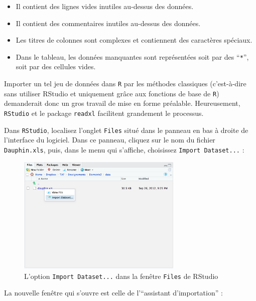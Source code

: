 \documentclass[
  a4paper,
  DIV=11,
  numbers=noendperiod,
  oneside]{scrreprt}
\providecommand{\tightlist}{%
  \setlength{\itemsep}{0pt}\setlength{\parskip}{0pt}}\usepackage{longtable,booktabs,array}
\begin{document}
\begin{itemize}
\tightlist
\item
  Il contient des lignes vides inutiles au-dessus des données.
\item
  Il contient des commentaires inutiles au-dessus des données.
\item
  Les titres de colonnes sont complexes et contiennent des caractères
  spéciaux.
\item
  Dans le tableau, les données manquantes sont représentées soit par des
  ``\texttt{*}'', soit par des cellules vides.
\end{itemize}

Importer un tel jeu de données dans \texttt{R} par les méthodes
classiques (c'est-à-dire sans utiliser RStudio et uniquement grâce aux
fonctions de base de \texttt{R}) demanderait donc un gros travail de
mise en forme préalable. Heureusement, \texttt{RStudio} et le package
\texttt{readxl} facilitent grandement le processus.

Dans \texttt{RStudio}, localisez l'onglet \texttt{Files} situé dans le
panneau en bas à droite de l'interface du logiciel. Dans ce panneau,
cliquez sur le nom du fichier \texttt{Dauphin.xls}, puis, dans le menu
qui s'affiche, choisissez \texttt{Import\ Dataset...} :

\begin{figure}[H]

{\centering \includegraphics[width=0.7\textwidth,height=\textheight]{images/import.png}

}

\caption{L'option \texttt{Import\ Dataset...} dans la fenêtre
\texttt{Files} de RStudio}

\end{figure}%

La nouvelle fenêtre qui s'ouvre est celle de l'``assistant
d'importation'' :
\end{document}
